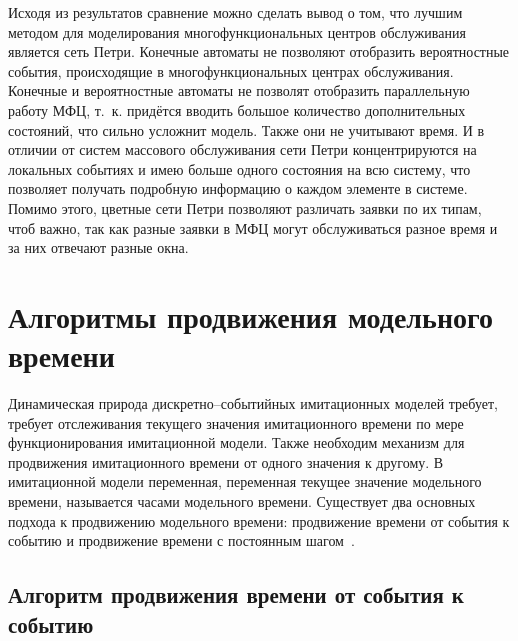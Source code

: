Исходя из результатов сравнение можно сделать вывод о том, что лучшим методом для моделирования многофункциональных центров обслуживания является сеть Петри. Конечные автоматы не позволяют отобразить вероятностные события, происходящие в многофункциональных центрах обслуживания. Конечные и вероятностные автоматы не позволят отобразить параллельную работу МФЦ, т.~к. придётся вводить большое количество дополнительных состояний, что сильно усложнит модель. Также они не учитывают время. И в отличии от систем массового обслуживания сети Петри концентрируются на локальных событиях и имею больше одного состояния на всю систему, что позволяет получать подробную информацию о каждом элементе в системе. Помимо этого, цветные сети Петри позволяют различать заявки по их типам, чтоб важно, так как разные заявки в МФЦ могут обслуживаться разное время и за них отвечают разные окна.


\section{Алгоритмы продвижения модельного времени}

Динамическая природа дискретно--событийных имитационных моделей требует, требует отслеживания текущего значения имитационного времени по мере функционирования имитационной модели. Также необходим механизм для продвижения имитационного времени от одного значения к другому. В имитационной модели переменная, переменная текущее значение модельного времени, называется часами модельного времени. Существует два основных подхода к продвижению модельного времени: продвижение времени от события к событию и продвижение времени с постоянным
шагом~\cite{time_alg}.

\subsection{Алгоритм продвижения времени от события к событию}

